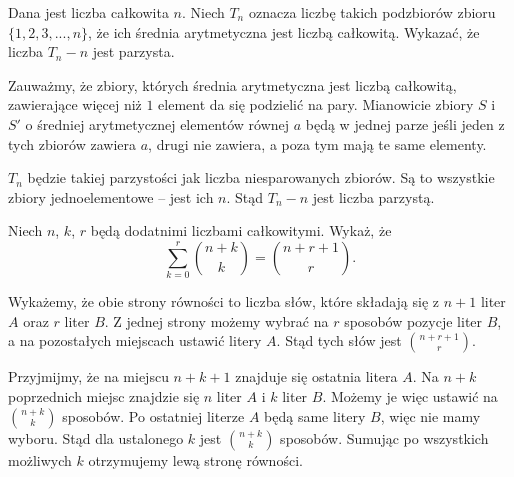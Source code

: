 \vspace{5px}



\begin{problem}{6}
	Dana jest liczba całkowita $n$. Niech $T_n$ oznacza liczbę takich podzbiorów zbioru $\{1, 2, 3, ..., n\}$, że ich średnia arytmetyczna jest liczbą całkowitą. Wykazać, że liczba $T_n - n$ jest parzysta.
\end{problem}

\vspace{5px}

\noindent
Zauważmy, że zbiory, których średnia arytmetyczna jest liczbą całkowitą, zawierające więcej niż $1$ element da się podzielić na pary. Mianowicie zbiory $S$ i $S'$ o średniej arytmetycznej elementów równej $a$ będą w jednej parze jeśli jeden z tych zbiorów zawiera $a$, drugi nie zawiera, a poza tym mają te same elementy.

$T_n$ będzie takiej parzystości jak liczba niesparowanych zbiorów. Są to wszystkie zbiory jednoelementowe -- jest ich $n$.  Stąd $T_n - n$ jest liczba parzystą.

\vspace{5px}

\begin{problem}{7}
	Niech $n$, $k$, $r$ będą dodatnimi liczbami całkowitymi. Wykaż, że
	\[
		\sum^{r}_{k=0} {{n + k}\choose{k}} = {{n + r + 1}\choose{r}} .
	\]
\end{problem}

\vspace{5px}

\noindent
Wykażemy, że obie strony równości to liczba słów, które składają się z $n + 1$ liter $A$ oraz $r$ liter $B$. Z jednej strony możemy wybrać na $r$ sposobów pozycje liter $B$, a na pozostałych miejscach ustawić litery $A$. Stąd tych słów jest ${{n + r + 1}\choose{r}}$.

Przyjmijmy, że na miejscu $n + k + 1$ znajduje się ostatnia litera $A$. Na $n + k$ poprzednich miejsc znajdzie się $n$ liter $A$ i $k$ liter $B$. Możemy je więc ustawić na ${{n + k}\choose{k}}$ sposobów. Po ostatniej literze $A$ będą same litery $B$, więc nie mamy wyboru. Stąd dla ustalonego $k$ jest ${{n + k}\choose{k}}$ sposobów. Sumując po wszystkich możliwych $k$ otrzymujemy lewą stronę równości.


